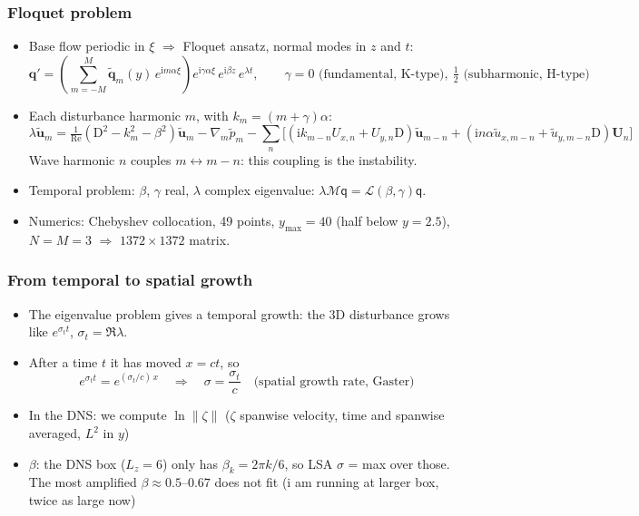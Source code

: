 \documentclass[
  aspectratio=169,
  t,
  onlytextwidth,
  10pt,
]{beamer}
\def\Rey{\text{Re}}
\newcommand{\awave}{\alpha}
\newcommand{\bU}{\boldsymbol{U}}
\newcommand{\bq}{\tilde{\boldsymbol{q}}}
\begin{document}
\begin{frame}
	\frametitle{Floquet problem}
	\begin{itemize}
		\item Base flow periodic in $\xi$ $\Rightarrow$ Floquet ansatz, normal modes in $z$ and $t$:
		      \[
			      \boldsymbol{q}'=\left(\sum_{m=-M}^{M}\bq_m(y)\,e^{\mathrm{i}m\awave\xi}\right)e^{\mathrm{i}\gamma\awave\xi}\,e^{\mathrm{i}\beta z}\,e^{\lambda t},
			      \qquad \gamma=0 \text{ (fundamental, K-type)},\ \tfrac12 \text{ (subharmonic, H-type)}
		      \]
		\item Each disturbance harmonic $m$, with $k_m=(m+\gamma)\awave$:
		      \[
			      \lambda\tilde{\boldsymbol{u}}_m=\tfrac{1}{\Rey}(\mathrm{D}^2-k_m^2-\beta^2)\tilde{\boldsymbol{u}}_m-\nabla_m\tilde p_m
			      -\sum_{n}\Big[(\mathrm{i}k_{m-n}U_{x,n}+U_{y,n}\mathrm{D})\tilde{\boldsymbol{u}}_{m-n}
				      +(\mathrm{i}n\awave\tilde u_{x,m-n}+\tilde u_{y,m-n}\mathrm{D})\bU_n\Big]
		      \]
		      Wave harmonic $n$ couples $m\leftrightarrow m-n$: this coupling is the instability.
		\item Temporal problem: $\beta$, $\gamma$ real, $\lambda$ complex eigenvalue: $\lambda\mathcal{M}\mathsf{q}=\mathcal{L}(\beta,\gamma)\mathsf{q}$.
		\item Numerics: Chebyshev collocation, 49 points, $y_{\max}=40$ (half below $y=2.5$), $N=M=3$ $\Rightarrow$ $1372\times1372$ matrix.
	\end{itemize}
\end{frame}

\begin{frame}
	\frametitle{From temporal to spatial growth}
	\begin{itemize}
		\item The eigenvalue problem gives a temporal growth: the 3D disturbance grows like $e^{\sigma_t t}$, $\sigma_t=\Re\lambda$.
		\item After a time $t$ it has moved $x=ct$, so
		      \[
			      e^{\sigma_t t}=e^{(\sigma_t/c)\,x}
			      \quad\Longrightarrow\quad
			      \sigma=\frac{\sigma_t}{c}\quad\text{(spatial growth rate, Gaster)}
		      \]
	      \item In the DNS: we compute $\ln\|\zeta\|$ ($\zeta$ spanwise velocity, time and spanwise averaged, $L^2$ in $y$)
		\item $\beta$: the DNS box ($L_z=6$) only has $\beta_k=2\pi k/6$, so LSA $\sigma$ = max over those. The most amplified $\beta\approx0.5$--$0.67$ does not fit (i am running at larger box, twice as large now)
	\end{itemize}
\end{frame}
\end{document}
